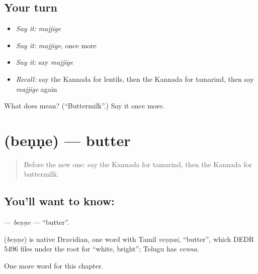 \subsection*{Your turn}
\begin{itemize}
\raggedright
  \item \emph{Say it:} \emph{majjige}
  \item \emph{Say it:} \emph{majjige}, once more
  \item \emph{Say it:} say \emph{majjige}
  \item \emph{Recall:} say the Kannada for lentils, then the Kannada for tamarind, then say \emph{majjige} again
\end{itemize}

\begin{tcolorbox}[breakable,colback=teal!4,colframe=teal!35!black,title={Before you move on}]
What does  mean? (\textquotedblleft{}Buttermilk\textquotedblright{}.) Say it once more.
\end{tcolorbox}
\section[\texorpdfstring{\kn{ಬೆಣ್ಣೆ} (beṇṇe)}{ಬೆಣ್ಣೆ (beṇṇe)}]{ (beṇṇe) — butter}

\label{lesson:KA-C258-benne}



\begin{quote}
Before the new one: say the Kannada for tamarind, then the Kannada for buttermilk.
\end{quote}

\subsection*{You'll want to know: }
\textbf{} — \emph{beṇṇe} — \textquotedblleft{}butter\textquotedblright{}.

\begin{cousinweb}
\textbf{} (\emph{beṇṇe}) is native Dravidian, one word with Tamil \emph{veṇṇai}, \textquotedblleft{}butter\textquotedblright{}, which DEDR 5496 files under the root for \textquotedblleft{}white, bright\textquotedblright{}; Telugu has \emph{venna}.
\end{cousinweb}

\begin{grammarlens}[title={What you've built}]
One more word for this chapter.
\end{grammarlens}

